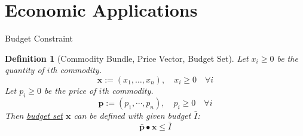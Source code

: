 \documentclass[final]{beamer}
\newtheorem{defn}{Definition}
\begin{document}
\section{Economic Applications} %
\label{sec:economic_applications}
\begin{frame}[t]{Budget Constraint}
	\begin{defn}
		[Commodity Bundle, Price Vector, Budget Set]
		Let $x_i\ge 0$ be the quantity of $i$th commodity. 
		\[
			\mathbf{x}:=(x_1,\dots,x_n),\quad x_i \ge 0\quad\forall i \tag{Commodity Bundle}
		\]
		Let $p_i\ge 0$ be the price of $i$th commodity. \[
			\mathbf{p}:=(p_1,\cdots,p_n),\quad p_i \ge 0\quad\forall i \tag{Price Vector}
		\]
		Then \uline{budget set} $\mathbf{x}$ can be defined with given budget $\bar{I}$:\[
			\bar{\mathbf{p}}\bullet{\mathbf{x}}\le \bar I \tag{Budget Constraint}
		\]
	\end{defn}
\end{frame}
\end{document}
